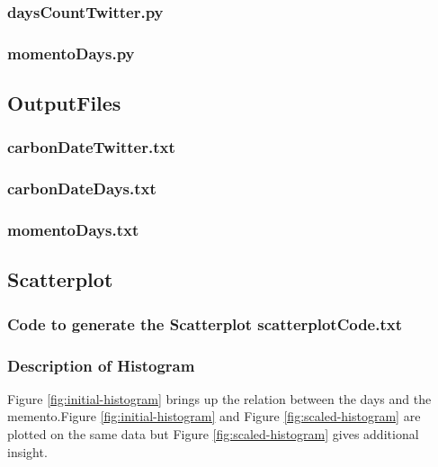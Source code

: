 \documentclass[12pt]{article}
\begin{document}
\newpage
\subsubsection{daysCountTwitter.py}

\newpage
\subsubsection{momentoDays.py}

\newpage
\subsection{OutputFiles}
\subsubsection{carbonDateTwitter.txt}

\subsubsection{carbonDateDays.txt}

\subsubsection{momentoDays.txt}

\newpage


\subsection{Scatterplot}
\subsubsection{Code to generate the Scatterplot scatterplotCode.txt}

\subsubsection{Description of Histogram}
Figure \ref{fig:initial-histogram} brings up the relation between the days and the memento.Figure \ref{fig:initial-histogram} and Figure \ref{fig:scaled-histogram} are plotted on the same data but Figure \ref{fig:scaled-histogram} gives additional insight. 
\end{document}
